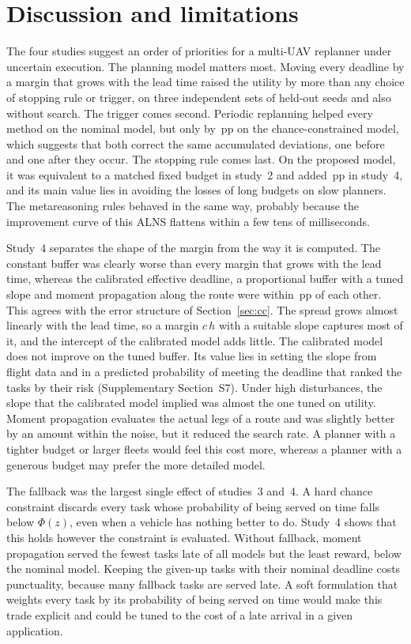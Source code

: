 \section{Discussion and limitations}\label{sec:discussion}
The four studies suggest an order of priorities for a multi-UAV replanner under uncertain execution. The planning
model matters most. Moving every deadline by a margin that grows with the lead time raised the utility by more than any
choice of stopping rule or trigger, on three independent sets of held-out seeds and also without search. The trigger
comes second. Periodic replanning helped every method on the nominal model, but only by \,pp on the
chance-constrained model, which suggests that both correct the same accumulated deviations, one before and one after
they occur. The stopping rule comes last. On the proposed model, it was equivalent to a matched fixed budget in
study~2 and added \,pp in study~4, and its main value lies in avoiding the losses of long budgets on
slow planners. The metareasoning rules behaved in the same way, probably because the improvement curve of this ALNS
flattens within a few tens of milliseconds.

Study~4 separates the shape of the margin from the way it is computed. The constant buffer was clearly worse than every
margin that grows with the lead time, whereas the calibrated effective deadline, a proportional buffer with a tuned
slope and moment propagation along the route were within \,pp of each other. This agrees with the
error structure of Section~\ref{sec:cc}. The spread grows almost linearly with the lead time, so a margin $c\,h$ with a
suitable slope captures most of it, and the intercept of the calibrated model adds little. The calibrated model does
not improve on the tuned buffer. Its value lies in setting the slope from flight data and in a predicted probability of
meeting the deadline that ranked the tasks by their risk (Supplementary Section~S7). Under high disturbances, the slope that the calibrated model
implied was almost the one tuned on utility. Moment propagation evaluates the actual legs of a route and was slightly
better by an amount within the noise, but it reduced the search rate. A planner with a tighter budget or larger fleets
would feel this cost more, whereas a planner with a generous budget may prefer the more detailed model.

The fallback was the largest single effect of studies~3 and~4. A hard chance constraint discards every task whose
probability of being served on time falls below $\Phi(z)$, even when a vehicle has nothing better to do. Study~4 shows
that this holds however the constraint is evaluated. Without fallback, moment propagation served the fewest tasks late
of all models but the least reward, below the nominal model. Keeping the given-up tasks with their nominal deadline
costs punctuality, because many fallback tasks are served late. A soft formulation that weights every task by its
probability of being served on time would make this trade explicit and could be tuned to the cost of a late arrival in a
given application.


